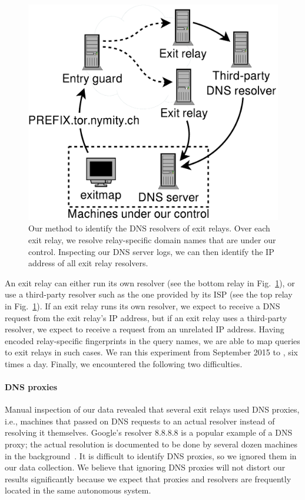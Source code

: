 \begin{figure}[t]
	\centering
	\includegraphics[width=0.7\linewidth]{figures/dns-resolver-enumeration.pdf}
	\caption{Our method to identify the DNS resolvers of exit relays.  Over each
	exit relay, we resolve relay-specific domain names that are under our control.
	Inspecting our DNS server logs, we can then identify the IP address of all
	exit relay resolvers.}
	\label{fig:dnsenum}
\end{figure}

An exit relay can either run its own resolver (see the bottom relay in
Fig.~\ref{fig:dnsenum}), or use a third-party resolver such as the one provided
by its ISP (see the top relay in Fig.~\ref{fig:dnsenum}).  If an exit relay runs
its own resolver, we expect to receive a DNS request from the exit relay's IP
address, but if an exit relay uses a third-party resolver, we expect to receive
a request from an unrelated IP address.  Having encoded relay-specific
fingerprints in the query names, we are able to map queries to exit relays in
such cases.  We ran this experiment from September 2015 to , six
times a day.  Finally, we encountered the following two difficulties.

\paragraph{DNS proxies}
Manual inspection of our data revealed that several exit relays used DNS
proxies, i.e., machines that passed on DNS requests to an actual resolver
instead of resolving it themselves.  Google's resolver 8.8.8.8 is a popular
example of a DNS proxy; the actual resolution is documented to be done by
several dozen machines in the background~\cite{google-proxies}.  It is
difficult to identify DNS proxies, so we ignored them in our data collection.
We believe that ignoring DNS proxies will not distort our results significantly
because we expect that proxies and resolvers are frequently located in the same
autonomous system.

